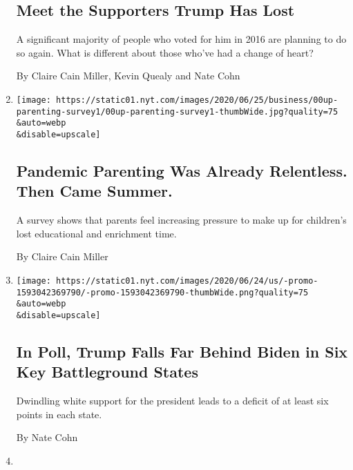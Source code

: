 \begin{enumerate}
  \hypertarget{meet-the-supporters-trump-has-lost}{%
  \subsection{Meet the Supporters Trump Has
  Lost}\label{meet-the-supporters-trump-has-lost}}

  A significant majority of people who voted for him in 2016 are
  planning to do so again. What is different about those who've had a
  change of heart?

  By Claire Cain Miller, Kevin Quealy and Nate Cohn
\item
  \href{/2020/06/26/upshot/virus-intensive-parenting-education.html}{}

  \texttt{[image: https://static01.nyt.com/images/2020/06/25/business/00up-parenting-survey1/00up-parenting-survey1-thumbWide.jpg?quality=75\\\&auto=webp\\\&disable=upscale]}

  \hypertarget{pandemic-parenting-was-already-relentless-then-came-summer}{%
  \subsection{Pandemic Parenting Was Already Relentless. Then Came
  Summer.}\label{pandemic-parenting-was-already-relentless-then-came-summer}}

  A survey shows that parents feel increasing pressure to make up for
  children's lost educational and enrichment time.

  By Claire Cain Miller
\item
  \href{/2020/06/25/upshot/poll-2020-biden-battlegrounds.html}{}

  \texttt{[image: https://static01.nyt.com/images/2020/06/24/us/-promo-1593042369790/-promo-1593042369790-thumbWide.png?quality=75\\\&auto=webp\\\&disable=upscale]}

  \hypertarget{in-poll-trump-falls-far-behind-biden-in-six-key-battleground-states}{%
  \subsection{In Poll, Trump Falls Far Behind Biden in Six Key
  Battleground
  States}\label{in-poll-trump-falls-far-behind-biden-in-six-key-battleground-states}}

  Dwindling white support for the president leads to a deficit of at
  least six points in each state.

  By Nate Cohn
\item
  \href{/2020/06/12/upshot/epidemiologists-decisions-children-school-coronavirus.html}{}


\end{enumerate}
